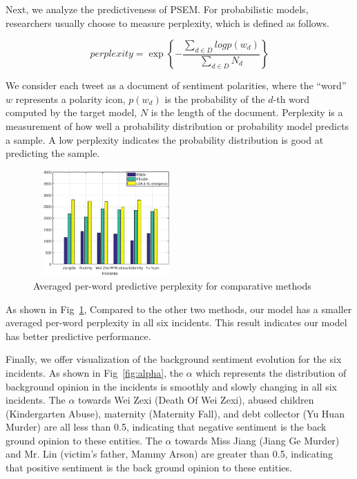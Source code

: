 \documentclass[runningheads]{llncs}
\begin{document}
Next, we analyze the predictiveness of PSEM. For probabilistic models, researchers usually choose to measure perplexity, which is defined as follows. 

\begin{equation}
    perplexity= \exp\left\{-\frac{\sum_{d \in D}logp(w_d)}{\sum_{d \in D}N_d} \right\}
\end{equation}

We consider each tweet as a document of sentiment polarities, where the ``word'' $w$ represents a polarity icon, $p(w_d)$ is the probability of the $d$-th word computed by the target model, $N$ is the length of the document. 
Perplexity is a measurement of how well a probability distribution or probability model predicts a sample. A low perplexity indicates the probability distribution is good at predicting the sample. 

\begin{figure}
    \centering
    \includegraphics[width=0.5\textwidth,height=1.6in]{perplexity.eps}
    \setlength{\abovecaptionskip}{-0.1cm}
    \caption{Averaged per-word predictive perplexity for comparative methods}\label{fig:perplexity}
\end{figure}

As shown in Fig~\ref{fig:perplexity},  Compared to the other two methods, our model has a smaller averaged per-word perplexity in all six incidents. This result indicates our model has better predictive performance.


Finally, we offer visualization of the background sentiment evolution for the six incidents. 
As shown in Fig~\ref{fig:alpha}, the $\alpha$ which represents the distribution of background opinion in the incidents is smoothly and slowly changing in all six incidents. The $\alpha$ towards Wei Zexi (Death Of Wei Zexi), abused children (Kindergarten Abuse), maternity (Maternity Fall), and debt collector (Yu Huan Murder) are all less than 0.5, indicating that negative sentiment is the back ground opinion to these entities. The $\alpha$ towards Miss Jiang (Jiang Ge Murder) and Mr. Lin (victim's father, Mammy Arson) are greater than 0.5, indicating that positive sentiment is the back ground opinion to these entities.
\end{document}
